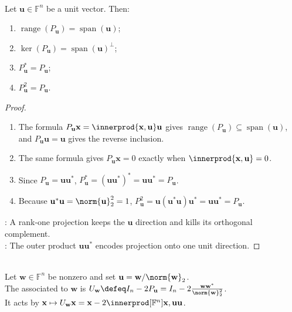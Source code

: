 \begin{proposition} \label{prop:rank-one-projection-matrix-properties} \\
Let $\mathbf{u}\in\mathbb{F}^n$ be a unit vector. Then:
\begin{enumerate}[label=\roman*.]
\setlength{\itemsep}{0pt}
\item $\operatorname{range}(P_{\mathbf{u}})=\operatorname{span}(\mathbf{u})$;
\item $\ker(P_{\mathbf{u}})=\operatorname{span}(\mathbf{u})^{\perp}$;
\item $P_{\mathbf{u}}^*=P_{\mathbf{u}}$;
\item $P_{\mathbf{u}}^2=P_{\mathbf{u}}$.
\end{enumerate}
\begin{proof}
\begin{enumerate}[label=(\roman*)]
\setlength{\itemsep}{0pt}
\item The formula $P_{\mathbf{u}}\mathbf{x}=\innerprod{\mathbf{x},\mathbf{u}}\mathbf{u}$ gives $\operatorname{range}(P_{\mathbf{u}})\subseteq\operatorname{span}(\mathbf{u})$, and $P_{\mathbf{u}}\mathbf{u}=\mathbf{u}$ gives the reverse inclusion.
\item The same formula gives $P_{\mathbf{u}}\mathbf{x}=0$ exactly when $\innerprod{\mathbf{x},\mathbf{u}}=0$.
\item Since $P_{\mathbf{u}}=\mathbf{u}\mathbf{u}^*$, $P_{\mathbf{u}}^*=(\mathbf{u}\mathbf{u}^*)^*=\mathbf{u}\mathbf{u}^*=P_{\mathbf{u}}$.
\item Because $\mathbf{u}^*\mathbf{u}=\norm{\mathbf{u}}_2^2=1$, $P_{\mathbf{u}}^2=\mathbf{u}(\mathbf{u}^*\mathbf{u})\mathbf{u}^*=\mathbf{u}\mathbf{u}^*=P_{\mathbf{u}}$.
\end{enumerate}
: A rank-one projection keeps the $\mathbf{u}$ direction and kills its orthogonal complement.\\
: The outer product $\mathbf{u}\mathbf{u}^*$ encodes projection onto one unit direction.
\end{proof}
\end{proposition}

\begin{definition} \label{def:householder-matrix} \\
Let $\mathbf{w}\in\mathbb{F}^n$ be nonzero and set $\mathbf{u}=\mathbf{w}/\norm{\mathbf{w}}_2$.\\
The  associated to $\mathbf{w}$ is $U_{\mathbf{w}}\defeq I_n-2P_{\mathbf{u}}=I_n-2\frac{\mathbf{w}\mathbf{w}^*}{\norm{\mathbf{w}}_2^2}$.\\
It acts by $\mathbf{x}\mapsto U_{\mathbf{w}}\mathbf{x}=\mathbf{x}-2\innerprod[\mathbb{F}^n]{\mathbf{x},\mathbf{u}}\mathbf{u}$.
\end{definition}

